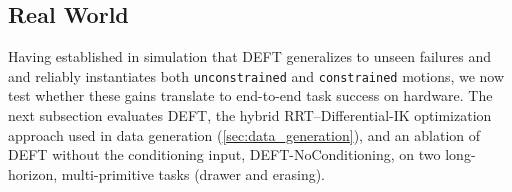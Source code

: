 \subsection{Real World}\label{sec:real_world}




Having established in simulation that \textsc{DEFT} generalizes to unseen failures and and reliably instantiates both \texttt{unconstrained} and \texttt{constrained} motions, we now test whether these gains translate to end-to-end task success on hardware. The next subsection evaluates \textsc{DEFT}, the hybrid RRT--Differential-IK optimization approach used in data generation (\cref{sec:data_generation}), and an ablation of DEFT without the conditioning input, \textsc{DEFT}-NoConditioning,  on two long-horizon, multi-primitive tasks (drawer and erasing). \vspace{-15pt}



